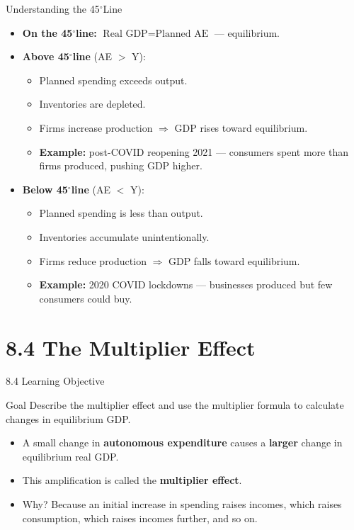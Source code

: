 \documentclass[aspectratio=169]{beamer}
\newcommand{\degree}{$^\circ$}
\begin{document}
\begin{frame}{Understanding the 45\degree Line}
\transfade
\begin{itemize}
  \item \textbf{On the 45\degree line:} $\text{Real GDP} = \text{Planned AE}$ --- equilibrium.
  \item \textbf{Above 45\degree line} (AE $>$ Y):
  \begin{itemize}
    \item Planned spending exceeds output.
    \item Inventories are depleted.
    \item Firms \alert{increase} production $\Rightarrow$ GDP rises toward equilibrium.
    \item \textbf{Example:} post-COVID reopening 2021 --- consumers spent more than firms produced, pushing GDP higher.
  \end{itemize}
  \item \textbf{Below 45\degree line} (AE $<$ Y):
  \begin{itemize}
    \item Planned spending is less than output.
    \item Inventories accumulate unintentionally.
    \item Firms \alert{reduce} production $\Rightarrow$ GDP falls toward equilibrium.
    \item \textbf{Example:} 2020 COVID lockdowns --- businesses produced but few consumers could buy.
  \end{itemize}
\end{itemize}
\end{frame}

\section{8.4 The Multiplier Effect}

\begin{frame}{8.4 Learning Objective}
\transfade
\begin{block}{Goal}
Describe the multiplier effect and use the multiplier formula to calculate changes in equilibrium GDP.
\end{block}
\begin{itemize}
  \item A small change in \textbf{autonomous expenditure} causes a \textbf{larger} change in equilibrium real GDP.
  \item This amplification is called the \textbf{multiplier effect}.
  \item Why? Because an initial increase in spending raises incomes, which raises consumption, which raises incomes further, and so on.
\end{itemize}
\end{frame}
\end{document}
